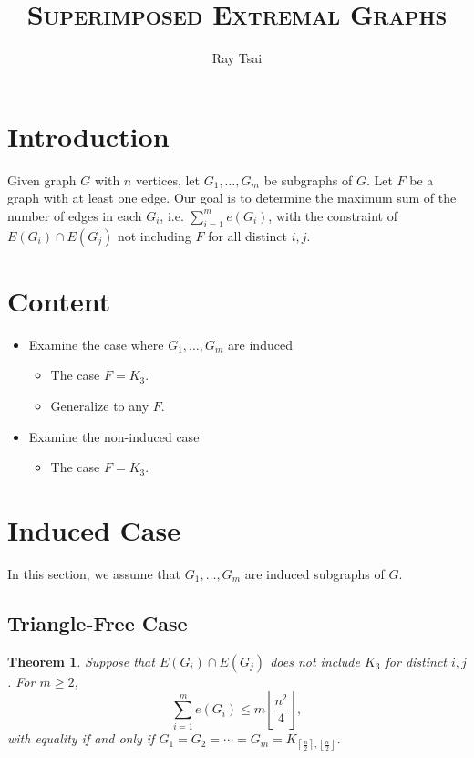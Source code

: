 \documentclass[a4paper]{article}
\title{\textsc{Superimposed Extremal Graphs}}
\author{Ray Tsai}
\date{}
\newtheorem{theorem}{Theorem}[section]
\begin{document}
\maketitle
                                                                                                                                
\section{Introduction}

Given graph $G$ with $n$ vertices, let $G_1, \ldots, G_m$ be subgraphs of $G$. Let $F$ be a graph
with at least one edge. Our goal is to determine the maximum sum of the number of edges in each
$G_i$, i.e. $\sum_{i = 1}^m e(G_i)$, with the constraint of $E(G_i) \cap E(G_j)$ not including $F$
for all distinct $i, j$. 

\section{Content}

\begin{itemize}
  \item Examine the case where $G_1, \ldots, G_m$ are induced
  \begin{itemize}
    \item The case $F = K_3$.
    \item Generalize to any $F$.
  \end{itemize}
  \item Examine the non-induced case
  \begin{itemize}
    \item The case $F = K_3$.
  \end{itemize}
\end{itemize}


\section{Induced Case}

In this section, we assume that $G_1, \ldots, G_m$ are induced subgraphs of $G$.

\subsection{Triangle-Free Case}

\begin{theorem}
  Suppose that $E(G_i) \cap E(G_j)$ does not include $K_3$ for distinct $i, j$. For $m \geq 2$,
  \[
    \sum_{i = 1}^m e(G_i) \leq m\left\lfloor\frac{n^2}{4}\right\rfloor,
  \]
  with equality if and only if $G_1 = G_2 = \cdots = G_m = K_{\left\lceil\frac{n}{2}\right\rceil,
  \left\lfloor\frac{n}{2}\right\rfloor}$.
\end{theorem}
\end{document}

